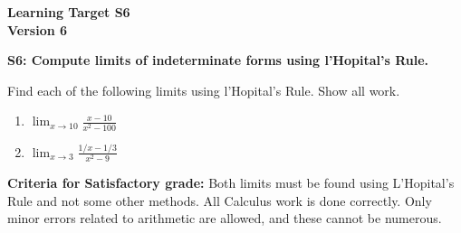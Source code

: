 \documentclass[10pt]{article}
\begin{document}
	\vspace*{0in}

		\begin{center}
			\textbf{Learning Target S6 \\
			Version 6} 
		\end{center}


\begin{framed}
	\textbf{S6: Compute limits of indeterminate forms using l'Hopital's Rule.}
\end{framed}

Find each of the following limits using l'Hopital's Rule. Show all work. 

\begin{enumerate}
    \item $\displaystyle{ \lim_{x \rightarrow 10} \frac{x-10}{x^2-100}}$
    \item $\displaystyle{  \lim_{x \rightarrow 3} \frac{ 1/x - 1/3 }{ x^2-9 }   }$
\end{enumerate}

\vfill


\begin{small}
    \begin{framed}
        	\textbf{Criteria for Satisfactory grade:} Both limits must be found using L'Hopital's Rule and not some other methods. All Calculus work is done correctly. Only minor errors related to arithmetic are allowed, and these cannot be numerous. 
    \end{framed}

\end{small}
\end{document}
